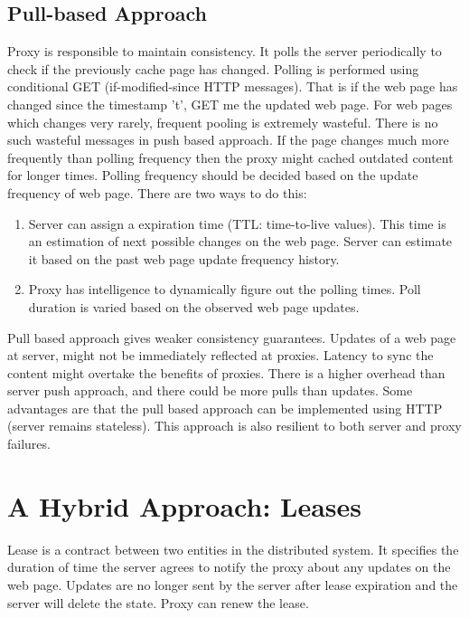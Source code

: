 \documentclass[twoside]{article}
\begin{document}
\subsection{Pull-based Approach}
Proxy is responsible to maintain consistency. It polls the server periodically to check if the previously cache page has changed. Polling is performed using conditional GET (if-modified-since HTTP messages). That is if the web page has changed since the timestamp 't', GET me the updated web page. For web pages which changes very rarely, frequent pooling is extremely wasteful. There is no such wasteful messages in push based approach. If the page changes much more frequently than polling frequency then the proxy might cached outdated content for longer times. Polling frequency should be decided based on the update frequency of web page. There are two ways to do this:
\begin{enumerate}
    \item Server can assign a expiration time (TTL: time-to-live values). This time is an estimation of next possible changes on the web page. Server can estimate it based on the past web page update frequency history.
    \item Proxy has intelligence to dynamically figure out the polling times. Poll duration is varied based on the observed web page updates. 
\end{enumerate}
Pull based approach gives weaker consistency guarantees. Updates of a web page at server, might not be immediately reflected at proxies. Latency to sync the content might overtake the benefits of proxies. There is a higher overhead than server push approach, and there could be more pulls than updates. Some advantages are that the pull based approach can be implemented using HTTP (server remains stateless). This approach is also resilient to both server and proxy failures.
\section{A Hybrid Approach: Leases}
Lease is a contract between two entities in the distributed system. It specifies the duration of time the server agrees to notify the proxy about any updates on the web page. Updates are no longer sent by the server after lease expiration and the server will delete the state. Proxy can renew the lease. 
\end{document}
